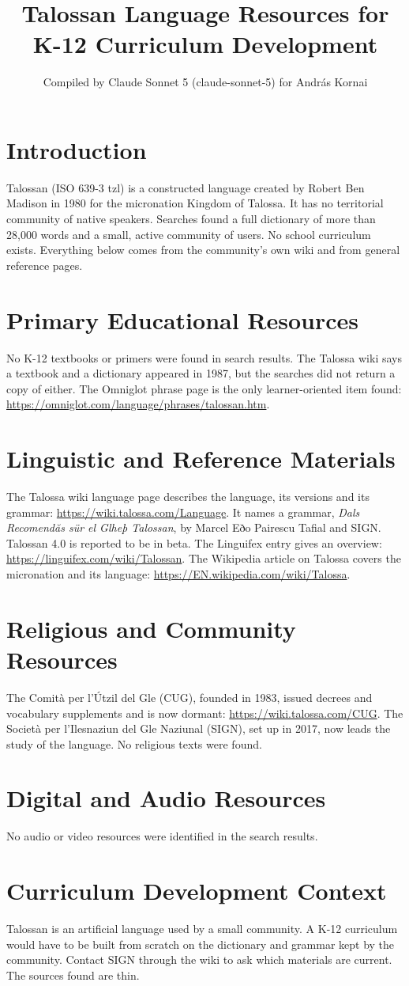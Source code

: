 \documentclass[12pt]{article}
\title{Talossan Language Resources for K-12 Curriculum Development}
\author{Compiled by Claude Sonnet 5 (claude-sonnet-5) for Andr\'as Kornai}
\date{}
\begin{document}
\maketitle
\section{Introduction}
Talossan (ISO 639-3 tzl) is a constructed language created by Robert Ben Madison in 1980 for the micronation Kingdom of Talossa. It has no territorial community of native speakers. Searches found a full dictionary of more than 28,000 words and a small, active community of users. No school curriculum exists. Everything below comes from the community's own wiki and from general reference pages.
\section{Primary Educational Resources}
No K-12 textbooks or primers were found in search results. The Talossa wiki says a textbook and a dictionary appeared in 1987, but the searches did not return a copy of either. The Omniglot phrase page is the only learner-oriented item found: \url{https://omniglot.com/language/phrases/talossan.htm}.
\section{Linguistic and Reference Materials}
The Talossa wiki language page describes the language, its versions and its grammar: \url{https://wiki.talossa.com/Language}. It names a grammar, \emph{Dals Recomendăs sür el Glheþ Talossan}, by Marcel Eðo Pairescu Tafial and SIGN. Talossan 4.0 is reported to be in beta. The Linguifex entry gives an overview: \url{https://linguifex.com/wiki/Talossan}. The Wikipedia article on Talossa covers the micronation and its language: \url{https://EN.wikipedia.com/wiki/Talossa}.
\section{Religious and Community Resources}
The Comit\`a per l'\'Utzil del Gle\th{} (CUG), founded in 1983, issued decrees and vocabulary supplements and is now dormant: \url{https://wiki.talossa.com/CUG}. The Societ\`a per l'Ilesnaziun del Gle\th{} Naziunal (SIGN), set up in 2017, now leads the study of the language. No religious texts were found.
\section{Digital and Audio Resources}
No audio or video resources were identified in the search results.
\section{Curriculum Development Context}
Talossan is an artificial language used by a small community. A K-12 curriculum would have to be built from scratch on the dictionary and grammar kept by the community. Contact SIGN through the wiki to ask which materials are current. The sources found are thin.
\end{document}
